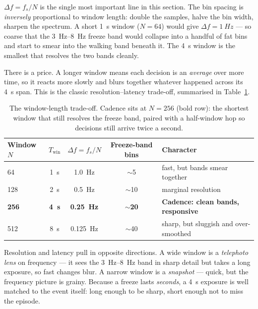 \begin{mathsbox}
$\Delta f = f_s/N$ is the single most important line in this section. The bin spacing
is \emph{inversely} proportional to window length: double the samples, halve the bin
width, sharpen the spectrum. A short \SI{1}{s} window ($N=64$) would give
$\Delta f = \SI{1}{Hz}$ --- so coarse that the \SIrange{3}{8}{Hz} freeze band would
collapse into a handful of fat bins and start to smear into the walking band beneath
it. The \SI{4}{s} window is the smallest that resolves the two bands cleanly.
\end{mathsbox}

There is a price. A longer window means each decision is an \emph{average} over more
time, so it reacts more slowly and blurs together whatever happened across its
\SI{4}{s} span. This is the classic resolution--latency trade-off, summarised in
Table~\ref{tab:tradeoff}.

\begin{table}[H]
\centering
\caption{The window-length trade-off. Cadence sits at $N=256$ (bold row): the
shortest window that still resolves the freeze band, paired with a half-window hop so
decisions still arrive twice a second.}
\label{tab:tradeoff}
\small
\begin{tabular}{@{}lcccl@{}}
\toprule
Window $N$ & $T_{\text{win}}$ & $\Delta f = f_s/N$ & Freeze-band bins & Character \\
\midrule
64  & \SI{1}{s} & \SI{1.0}{Hz}  & $\sim$5  & fast, but bands smear together \\
128 & \SI{2}{s} & \SI{0.5}{Hz}  & $\sim$10 & marginal resolution \\
\textbf{256} & \textbf{\SI{4}{s}} & \textbf{\SI{0.25}{Hz}} & \textbf{$\sim$20} & \textbf{\textcolor{amber}{Cadence: clean bands, responsive}} \\
512 & \SI{8}{s} & \SI{0.125}{Hz} & $\sim$40 & sharp, but sluggish and over-smoothed \\
\bottomrule
\end{tabular}
\end{table}

\begin{intuition}
Resolution and latency pull in opposite directions. A wide window is a
\emph{telephoto lens} on frequency --- it sees the \SIrange{3}{8}{Hz} band in sharp
detail but takes a long exposure, so fast changes blur. A narrow window is a
\emph{snapshot} --- quick, but the frequency picture is grainy. Because a freeze
lasts \emph{seconds}, a \SI{4}{s} exposure is well matched to the event itself: long
enough to be sharp, short enough not to miss the episode.
\end{intuition}

